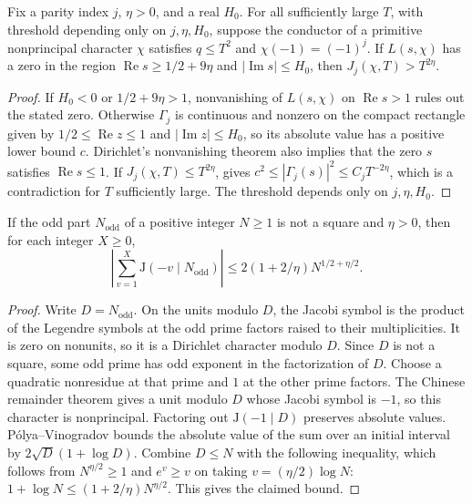 \begin{lemma}
\label{lem:theta-detect}
\emitthmsource
Fix a parity index $j$, $\eta>0$, and a real $H_0$. For all sufficiently large $T$, with threshold depending only on $j,\eta,H_0$, suppose the conductor of a primitive nonprincipal character $\chi$ satisfies $q\le T^2$ and $\chi(-1)=(-1)^j$. If $L(s,\chi)$ has a zero in the region $\operatorname{Re}s\ge1/2+9\eta$ and $|\operatorname{Im}s|\le H_0$, then $J_j(\chi,T)>T^{2\eta}$.
\end{lemma}
\begin{proof}
If $H_0<0$ or $1/2+9\eta>1$, nonvanishing of $L(s,\chi)$ on $\operatorname{Re}s>1$ rules out the stated zero.
Otherwise $\Gamma_j$ is continuous and nonzero on the compact rectangle
given by $1/2\le\operatorname{Re}z\le1$ and $|\operatorname{Im}z|\le H_0$, so its absolute value has a positive lower bound $c$.
Dirichlet's nonvanishing theorem also implies that the zero $s$ satisfies $\operatorname{Re}s\le1$.
If $J_j(\chi,T)\le T^{2\eta}$,  gives
$c^2\le|\Gamma_j(s)|^2\le C_jT^{-2\eta}$,
which is a contradiction for $T$ sufficiently large. The threshold depends only on $j,\eta,H_0$.
\end{proof}

\begin{lemma}
\label{lem:jacobi-interval}
\emitthmsource
If the odd part $N_{\mathrm{odd}}$ of a positive integer $N\ge1$ is not a square and $\eta>0$, then for each integer $X\ge0$,
\[
 \left|\sum_{v=1}^X\mathrm J(-v\mid N_{\mathrm{odd}})\right|
 \le 2(1+2/\eta)N^{1/2+\eta/2}.
\]
\end{lemma}
\begin{proof}
Write $D=N_{\mathrm{odd}}$. On the units modulo $D$, the Jacobi symbol is the product of the Legendre symbols at the odd prime factors raised to their multiplicities.
It is zero on nonunits, so it is a Dirichlet character modulo $D$.
Since $D$ is not a square, some odd prime has odd exponent in the factorization of $D$.
Choose a quadratic nonresidue at that prime and $1$ at the other prime factors.
The Chinese remainder theorem gives a unit modulo $D$ whose Jacobi symbol is $-1$, so this character is nonprincipal.
Factoring out $\mathrm J(-1\mid D)$ preserves absolute values.
Pólya--Vinogradov bounds the absolute value of the sum over an initial interval by $2\sqrt D(1+\log D)$.
Combine $D\le N$ with the following inequality, which follows from $N^{\eta/2}\ge1$ and $e^v\ge v$ on taking $v=(\eta/2)\log N$:
$1+\log N\le (1+2/\eta)N^{\eta/2}$. This gives the claimed bound.
\end{proof}

